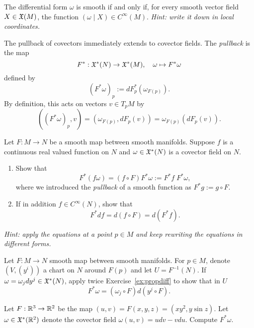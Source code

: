 \begin{exercise}
	The differential form $\omega$ is smooth if and only if, for every smooth vector field $X\in\mathfrak{X}(M)$, the function $(\omega \mid X)\in C^\infty(M)$.
	\textit{\small Hint: write it down in local coordinates.}
\end{exercise}

\begin{definition}\label{def:pullback1f}
	The pullback of covectors immediately extends to covector fields.
	The \emph{pullback} is the map
	\begin{equation}
		F^*: \mathfrak{X}^*(N) \to \mathfrak{X}^*(M), \quad \omega \mapsto F^* \omega
	\end{equation}
	defined by
	\begin{equation}
		(F^*\omega)_p := dF_p^*(\omega_{F(p)}).
	\end{equation}
	By definition, this acts on vectors $v\in T_p M$ by
	\begin{equation}
		((F^*\omega)_p, v) = (\omega_{F(p)}, dF_p(v)) = \omega_{F(p)}(dF_p(v)).
	\end{equation}
\end{definition}

\begin{exercise}\label{ex:propdiff}
	Let $F:M\to N$ be a smooth map between smooth manifolds.
	Suppose $f$ is a continuous real valued function on $N$ and $\omega\in\mathfrak{X}^*(N)$ is a covector field on $N$.
	\begin{enumerate}
		\item Show that
		      \begin{equation}
			      F^*(f\omega) = (f\circ F)F^*\omega := F^* f\; F^*\omega,
		      \end{equation}
		      where we introduced the \emph{pullback} of a smooth function as $F^*g := g\circ F$.
		\item If in addition $f\in C^\infty(N)$, show that
		      \begin{equation}
			      F^* df = d (f\circ F) = d (F^* f).
		      \end{equation}
	\end{enumerate}
	\textit{\small Hint: apply the equations at a point $p\in M$ and keep rewriting the equations in different forms.}
\end{exercise}

\begin{exercise}
	Let $F:M\to N$ smooth map between smooth manifolds.
	For $p\in M$, denote $(V, (y^i))$ a chart on $N$ around $F(p)$ and let $U=F^{-1}(N)$.
	If $\omega = \omega_j dy^j \in\mathfrak{X}^*(N)$, apply twice Exercise~\ref{ex:propdiff} to show that in $U$
	\begin{equation}
		F^*\omega = (\omega_j\circ F) d(y^j \circ F).
	\end{equation}

	Let $F:\mathbb{R}^3\to\mathbb{R}^2$ be the map $(u,v) = F(x,y,z) = (x y^2, y \sin z)$.
	Let $\omega\in\mathfrak{X}^*(\mathbb{R}^2)$ denote the covector field $\omega(u,v) = u dv - v du$.
	Compute $F^* \omega$.
\end{exercise}


